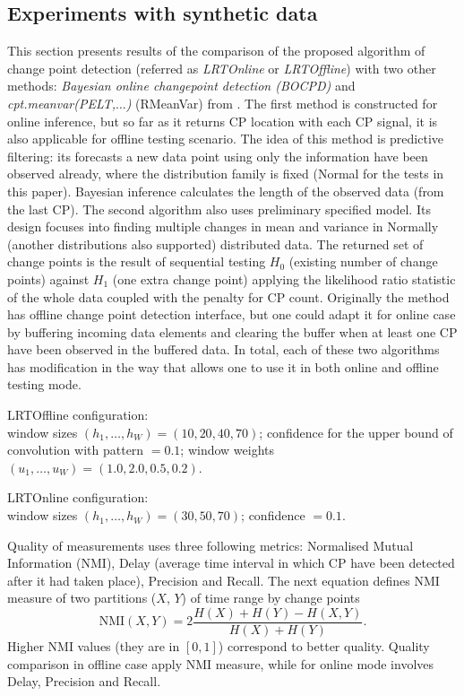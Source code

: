 \label{sec:experiments}

\subsection{Experiments with synthetic data}

This section presents results of the comparison of the proposed algorithm of change point detection (referred as \textit{LRTOnline} or \textit{LRTOffline}) with two other methods: \textit{Bayesian online changepoint detection (BOCPD)}  \citet{BayesOnlineWeb} and \textit{cpt.meanvar(PELT,$\ldots$)} (RMeanVar) from \citet{RPackage}. 
The first method is constructed for online inference, but so far as it returns CP location with each CP signal, it is also applicable for offline testing scenario. The idea of this method is predictive filtering: its forecasts a new data point using only the information have been observed already, where the distribution family is fixed (Normal for the tests in this paper). Bayesian inference calculates the length of the observed data (from the last CP).
The second algorithm also uses preliminary specified model. Its design focuses into finding multiple changes in mean and variance in Normally (another distributions also supported) distributed data. The returned set of change points is the result of sequential testing $H_0$ (existing number of change points) against $H_1$ (one extra change point) applying the likelihood ratio statistic of the whole data coupled with the penalty for CP count. Originally the method has offline change point detection interface, but one could adapt it for online case by buffering incoming data elements and clearing the buffer when at least one CP have been observed in the buffered data. 
In total, each of these two algorithms has modification in the way that allows one to use it in both online and offline testing mode. 

LRTOffline configuration:  \\
window sizes $(h_1, \ldots, h_W) = (10, 20, 40, 70)$; 
confidence for the upper bound of convolution with pattern $= 0.1$; 
window weights $(u_1, \ldots, u_W)  = (1.0, 2.0, 0.5, 0.2)$. 

LRTOnline configuration:  \\
window sizes $(h_1, \ldots, h_W) = (30, 50, 70)$; 
confidence $= 0.1$.


Quality of measurements  uses three following metrics: Normalised Mutual Information (NMI), Delay (average time interval in which CP have been detected after it had taken place), Precision  and Recall. The next equation defines 
NMI measure of two partitions ($X$, $Y$) of time range by change points
\[
\text{NMI}(X,Y) = 2 \frac{H(X) + H(Y) - H(X,Y)}{H(X) + H(Y)}.
\]
Higher NMI values (they are in $[0,1]$) correspond to better quality. 
Quality comparison in offline case apply NMI measure, while  for online mode involves Delay, Precision  and Recall. 

